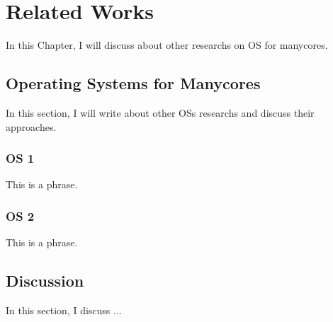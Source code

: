 \chapter{Related Works}
\label{ch.related-works}

In this Chapter, I will discuss about other researchs on OS for manycores.

\section{Operating Systems for Manycores}
    In this section, I will write about other OSs researchs and discuss their approaches.

\subsection{OS 1}
    This is a phrase.

\subsection{OS 2}
    This is a phrase.

\section{Discussion}
    In this section, I discuss ...